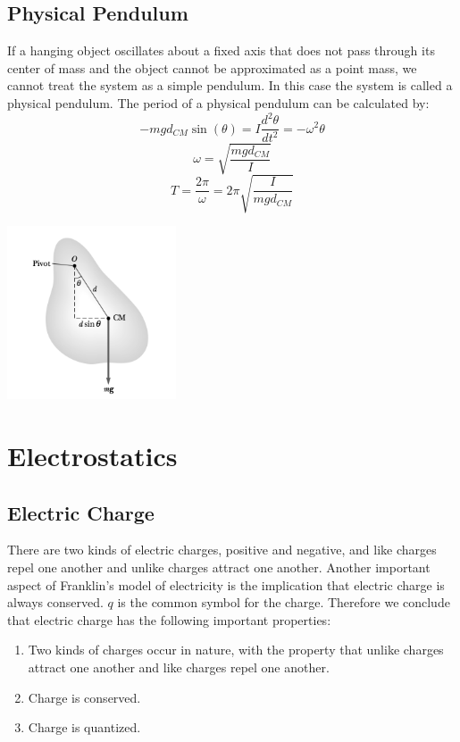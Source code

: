 \documentclass{article}
\begin{document}
	\subsection{Physical Pendulum}
    	\begin{multicols}{2}
    		If a hanging object oscillates about a fixed axis that does not pass through its center of mass and the object cannot be approximated as a point mass, we cannot treat the system as a simple pendulum. In this case the system is called a physical pendulum. The period of a physical pendulum can be calculated by:
        	\[
        		-mgd_{CM}\sin(\theta)=I\frac{d^2\theta}{dt^2}=-\omega^2\theta
        	\]
        	\[
        		\omega=\sqrt{\frac{mgd_{CM}}{I}}
        	\]
        	\[
        		T=\frac{2\pi}{\omega}=2\pi\sqrt{\frac{I}{mgd_{CM}}}
        	\]        	\centerline{\includegraphics[width=5cm]{phyPen.png}}
        \end{multicols}
        
\section{Electrostatics}
	\subsection{Electric Charge}
    	There are two kinds of electric charges, positive and negative, and like charges repel one another and unlike charges attract one another. Another important aspect of Franklin’s model of electricity is the implication that electric charge is always conserved. $q$ is the common symbol for the charge. Therefore we conclude that electric charge has the following important properties:\\
        \begin{enumerate}
        	\item Two kinds of charges occur in nature, with the property that unlike charges attract one another and like charges repel one another.
            \item Charge is conserved.
            \item Charge is quantized.
        \end{enumerate}
        
\end{document}
